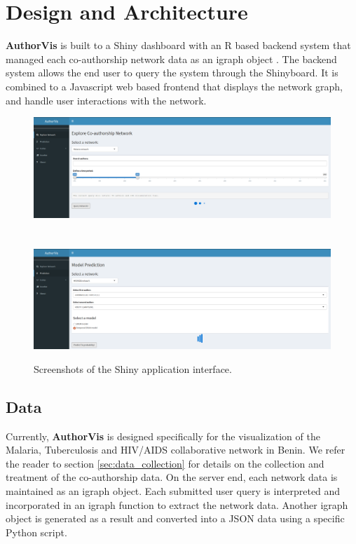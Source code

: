 \section{Design and Architecture}
\textbf{AuthorVis} is built to a Shiny dashboard with an R based backend system that managed each co-authorship network data as an igraph object \cite{csardi_igraph_2006}. The backend system allows the end user to query the system through the Shinyboard. It is combined to a Javascript web based frontend that displays the network graph, and handle user interactions with the network.

\begin{figure}[!ht]
\centering
\hspace{-1.5cm}\includegraphics[scale=0.26]{Chapters/authorvis/screen2}
~\\~\\
\hspace{-1.5cm}\includegraphics[scale=0.26]{Chapters/authorvis/screen4}
\caption{Screenshots of the Shiny application interface.}
\label{authorvis_screen1}
\end{figure}

\subsection{Data}
Currently, \textbf{AuthorVis} is designed specifically for the visualization of the Malaria, Tuberculosis and HIV/AIDS collaborative network in Benin. We refer the reader to section \ref{sec:data_collection} for details on the collection and treatment of the co-authorship data. On the server end, each network data is maintained as an igraph object. Each submitted user query is interpreted and incorporated in an igraph function to extract the network data. Another igraph object is generated as a result and converted into a JSON data using a specific Python script.

